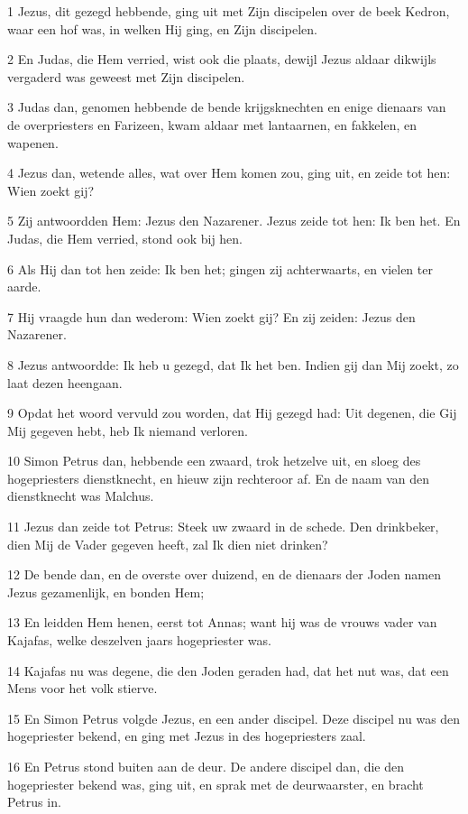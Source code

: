 \par 1 Jezus, dit gezegd hebbende, ging uit met Zijn discipelen over de beek Kedron, waar een hof was, in welken Hij ging, en Zijn discipelen.
\par 2 En Judas, die Hem verried, wist ook die plaats, dewijl Jezus aldaar dikwijls vergaderd was geweest met Zijn discipelen.
\par 3 Judas dan, genomen hebbende de bende krijgsknechten en enige dienaars van de overpriesters en Farizeen, kwam aldaar met lantaarnen, en fakkelen, en wapenen.
\par 4 Jezus dan, wetende alles, wat over Hem komen zou, ging uit, en zeide tot hen: Wien zoekt gij?
\par 5 Zij antwoordden Hem: Jezus den Nazarener. Jezus zeide tot hen: Ik ben het. En Judas, die Hem verried, stond ook bij hen.
\par 6 Als Hij dan tot hen zeide: Ik ben het; gingen zij achterwaarts, en vielen ter aarde.
\par 7 Hij vraagde hun dan wederom: Wien zoekt gij? En zij zeiden: Jezus den Nazarener.
\par 8 Jezus antwoordde: Ik heb u gezegd, dat Ik het ben. Indien gij dan Mij zoekt, zo laat dezen heengaan.
\par 9 Opdat het woord vervuld zou worden, dat Hij gezegd had: Uit degenen, die Gij Mij gegeven hebt, heb Ik niemand verloren.
\par 10 Simon Petrus dan, hebbende een zwaard, trok hetzelve uit, en sloeg des hogepriesters dienstknecht, en hieuw zijn rechteroor af. En de naam van den dienstknecht was Malchus.
\par 11 Jezus dan zeide tot Petrus: Steek uw zwaard in de schede. Den drinkbeker, dien Mij de Vader gegeven heeft, zal Ik dien niet drinken?
\par 12 De bende dan, en de overste over duizend, en de dienaars der Joden namen Jezus gezamenlijk, en bonden Hem;
\par 13 En leidden Hem henen, eerst tot Annas; want hij was de vrouws vader van Kajafas, welke deszelven jaars hogepriester was.
\par 14 Kajafas nu was degene, die den Joden geraden had, dat het nut was, dat een Mens voor het volk stierve.
\par 15 En Simon Petrus volgde Jezus, en een ander discipel. Deze discipel nu was den hogepriester bekend, en ging met Jezus in des hogepriesters zaal.
\par 16 En Petrus stond buiten aan de deur. De andere discipel dan, die den hogepriester bekend was, ging uit, en sprak met de deurwaarster, en bracht Petrus in.
